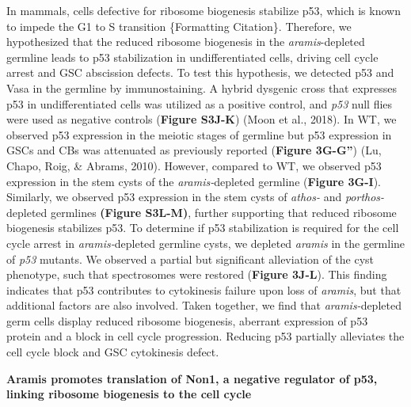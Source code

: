 \documentclass[12pt,twoside]{reedthesis}
\begin{document}
In mammals, cells defective for ribosome biogenesis stabilize p53, which
is known to impede the G1 to S transition \{Formatting Citation\}.
Therefore, we hypothesized that the reduced ribosome biogenesis in the
\emph{aramis}-depleted germline leads to p53 stabilization in
undifferentiated cells, driving cell cycle arrest and GSC abscission
defects. To test this hypothesis, we detected p53 and Vasa in the
germline by immunostaining. A hybrid dysgenic cross that expresses p53
in undifferentiated cells was utilized as a positive control, and \emph{p53}
null flies were used as negative controls (\textbf{Figure S3J-K})
(Moon et al., 2018). In WT, we observed p53 expression in the meiotic stages
of germline but p53 expression in GSCs and CBs was attenuated as
previously reported (\textbf{Figure 3G-G''})
(Lu, Chapo, Roig, \& Abrams, 2010). However, compared to WT, we
observed p53 expression in the stem cysts of the \emph{aramis-}depleted
germline (\textbf{Figure 3G-I}). Similarly, we observed p53 expression in the
stem cysts of \emph{athos-} and \emph{porthos-}depleted germlines \textbf{(Figure
S3L-M)}, further supporting that reduced ribosome biogenesis stabilizes
p53. To determine if p53 stabilization is required for the cell cycle
arrest in \emph{aramis-}depleted germline cysts, we depleted \emph{aramis} in the
germline of \emph{p53} mutants. We observed a partial but significant
alleviation of the cyst phenotype, such that spectrosomes were restored
(\textbf{Figure 3J-L}). This finding indicates that p53 contributes to
cytokinesis failure upon loss of \emph{aramis}, but that additional factors
are also involved. Taken together, we find that \emph{aramis-}depleted germ
cells display reduced ribosome biogenesis, aberrant expression of p53
protein and a block in cell cycle progression. Reducing p53 partially
alleviates the cell cycle block and GSC cytokinesis defect.

\textbf{Aramis promotes translation of Non1, a negative regulator of p53,
linking ribosome biogenesis to the cell cycle}
\end{document}
